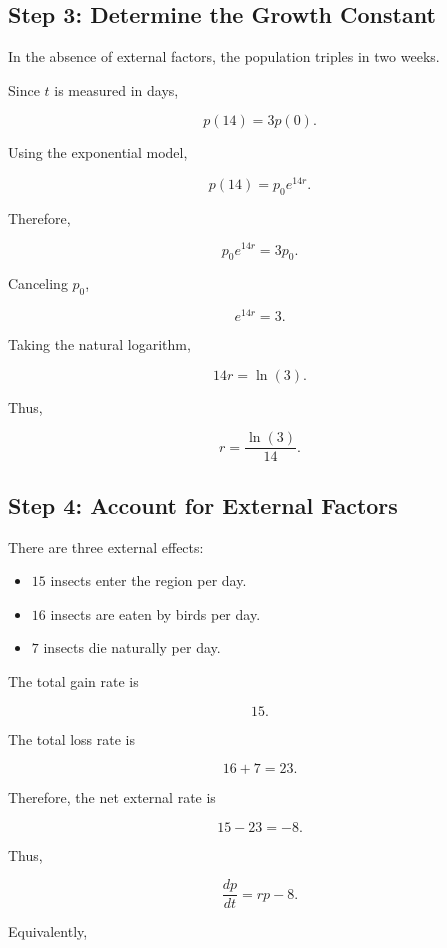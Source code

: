 \documentclass[11pt]{article}
\begin{document}
\subsection{Step 3: Determine the Growth Constant}

In the absence of external factors, the population triples in
two weeks.

Since \(t\) is measured in days,

\[
p(14)=3p(0).
\]

Using the exponential model,

\[
p(14)=p_0e^{14r}.
\]

Therefore,

\[
p_0e^{14r}=3p_0.
\]

Canceling \(p_0\),

\[
e^{14r}=3.
\]

Taking the natural logarithm,

\[
14r=\ln(3).
\]

Thus,

\[
\boxed{
r=\frac{\ln(3)}{14}.
}
\]

\subsection{Step 4: Account for External Factors}

There are three external effects:

\begin{itemize}
    \item \(15\) insects enter the region per day.
    \item \(16\) insects are eaten by birds per day.
    \item \(7\) insects die naturally per day.
\end{itemize}

The total gain rate is

\[
15.
\]

The total loss rate is

\[
16+7=23.
\]

Therefore, the net external rate is

\[
15-23=-8.
\]

Thus,

\[
\boxed{
\frac{dp}{dt}=rp-8.
}
\]

Equivalently,
\end{document}
